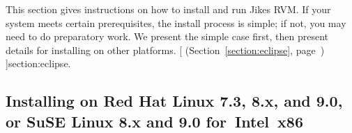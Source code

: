 \newcommand{\AtManualClasspathRootDiscussion}[1]{at
 \link{the discussion of setting up \texttt{CLASSPATH\_ROOT}#1}[; it's in
 Section~\ref{sec:manual-classpath-root}, item~\Ref,
 sub-item~\texttt{CLASS\-PATH\_\-ROOT}, on page~\Pageref]{manual-classpath-root}.}%
This section gives instructions on how to install and run Jikes\TMweb{} RVM.\@
If your system meets certain prerequisites, the install process is
simple; if not, you may need to do preparatory work.  We
present the simple case first, then present details for installing
on other platforms.  
%
[
 (Section~\ref{section:eclipse}, page~\pageref{section:eclipse})%
]{section:eclipse}.\@

\subsection{Installing on Red Hat Linux 7.3, 8.x, and 9.0, or SuSE Linux 8.x and 9.0 for~Intel~x86}

